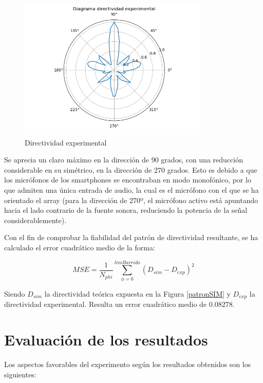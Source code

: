\documentclass[a4paper,11pt]{book}
\begin{document}
\begin{figure}[hbtp]
\centering
\includegraphics[width = 9cm]{FIGURAS/directividad_experimental.png}
\caption{Directividad experimental}
\end{figure}


Se aprecia un claro máximo en la dirección de 90 grados, con una reducción considerable en su simétrico, en la dirección de 270 grados. Esto es debido a que los micrófonos de los smartphones se encontraban en modo monofónico, por lo que admiten una única entrada de audio, la cual es el micrófono con el que se ha orientado el array (para la dirección de 270º, el micrófono activo está apuntando hacia el lado contrario de la fuente sonora, reduciendo la potencia de la señal considerablemente).

Con el fin de comprobar la fiabilidad del patrón de directividad resultante, se ha calculado el error cuadrático medio de la forma:

\begin{equation}
MSE = \frac{1}{N_{phi}}\sum_{\phi = 0}^{limBarrido} (D_{sim} - D_{exp})^2
\end{equation}

Siendo $D_{sim}$ la directividad teórica expuesta en la Figura \ref{patronSIM} y $D_{exp}$ la directividad experimental. Resulta un error cuadrático medio de \textbf{$0.08278$}.


\section{Evaluación de los resultados}

Los aspectos favorables del experimento según los resultados obtenidos son los siguientes:
\end{document}
